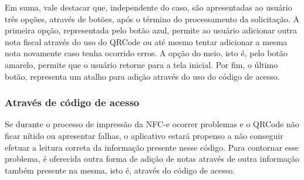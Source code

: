 \newpage
Em suma, vale destacar que, independente do caso, são apresentadas ao usuário três opções, através de botões, após o término do processamento da solicitação. A primeira opção, representada pelo botão azul, permite ao usuário adicionar outra nota fiscal através do uso do QRCode ou até mesmo tentar adicionar a mesma nota novamente caso tenha ocorrido erros. A opção do meio, isto é, pelo botão amarelo, permite que o usuário retorne para a tela inicial. Por fim, o último botão, representa um atalho para adição através do uso do código de acesso.

\subsubsection{Através de código de acesso}

Se durante o processo de impressão da NFC-e ocorrer problemas e o QRCode não ficar nítido ou apresentar falhas, o aplicativo estará propenso a não conseguir efetuar a leitura correta da informação presente nesse código. Para contornar esse problema, é oferecida outra forma de adição de notas através de outra informação também presente na mesma, isto é, através do código de acesso.


